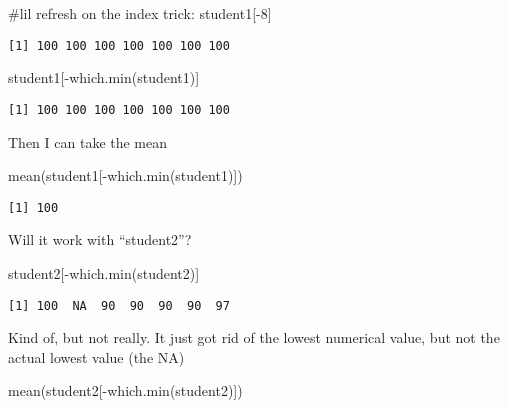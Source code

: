 \documentclass[
  letterpaper,
  DIV=11,
  numbers=noendperiod]{scrartcl}
\newenvironment{Shaded}{\begin{snugshade}}{\end{snugshade}}
\newcommand{\CommentTok}[1]{\textcolor[rgb]{0.37,0.37,0.37}{#1}}
\newcommand{\DecValTok}[1]{\textcolor[rgb]{0.68,0.00,0.00}{#1}}
\newcommand{\FunctionTok}[1]{\textcolor[rgb]{0.28,0.35,0.67}{#1}}
\newcommand{\NormalTok}[1]{\textcolor[rgb]{0.00,0.23,0.31}{#1}}
\newcommand{\SpecialCharTok}[1]{\textcolor[rgb]{0.37,0.37,0.37}{#1}}
\begin{document}
\begin{Shaded}
\begin{Highlighting}[]
\CommentTok{\#lil refresh on the index trick:}
\NormalTok{student1[}\SpecialCharTok{{-}}\DecValTok{8}\NormalTok{]}
\end{Highlighting}
\end{Shaded}

\begin{verbatim}
[1] 100 100 100 100 100 100 100
\end{verbatim}

\begin{Shaded}
\begin{Highlighting}[]
\NormalTok{student1[}\SpecialCharTok{{-}}\FunctionTok{which.min}\NormalTok{(student1)]}
\end{Highlighting}
\end{Shaded}

\begin{verbatim}
[1] 100 100 100 100 100 100 100
\end{verbatim}

Then I can take the mean

\begin{Shaded}
\begin{Highlighting}[]
\FunctionTok{mean}\NormalTok{(student1[}\SpecialCharTok{{-}}\FunctionTok{which.min}\NormalTok{(student1)])}
\end{Highlighting}
\end{Shaded}

\begin{verbatim}
[1] 100
\end{verbatim}

Will it work with ``student2''?

\begin{Shaded}
\begin{Highlighting}[]
\NormalTok{student2[}\SpecialCharTok{{-}}\FunctionTok{which.min}\NormalTok{(student2)]}
\end{Highlighting}
\end{Shaded}

\begin{verbatim}
[1] 100  NA  90  90  90  90  97
\end{verbatim}

Kind of, but not really. It just got rid of the lowest numerical value,
but not the actual lowest value (the NA)

\begin{Shaded}
\begin{Highlighting}[]
\FunctionTok{mean}\NormalTok{(student2[}\SpecialCharTok{{-}}\FunctionTok{which.min}\NormalTok{(student2)])}
\end{Highlighting}
\end{Shaded}
\end{document}
